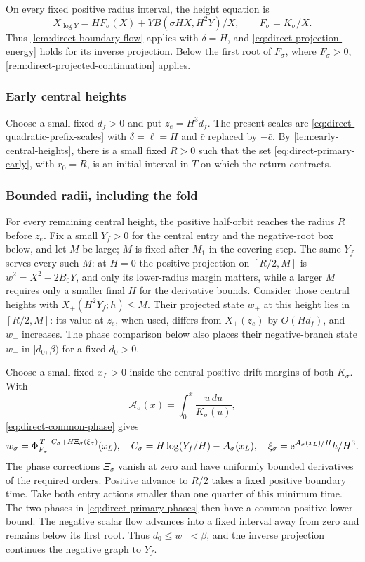 On every fixed positive radius interval, the height equation is
\[
 X_{\log Y}=HF_\sigma(X)+YB(\sigma HX,H^2Y)/X,\qquad
 F_\sigma=K_\sigma/X.
\]
Thus \cref{lem:direct-boundary-flow} applies with \(\delta=H\), and
\eqref{eq:direct-projection-energy} holds for its inverse projection.
Below the first root of \(F_\sigma\), where \(F_\sigma>0\),
\cref{rem:direct-projected-continuation} applies.

\subsubsection{Early central heights}

Choose a small fixed \(d_f>0\) and put \(z_e=H^3d_f\). The present
scales are \eqref{eq:direct-quadratic-prefix-scales} with
\(\delta=\ell=H\) and \(\bar c\) replaced by \(-\bar c\). By
\cref{lem:early-central-heights}, there is a small fixed \(R>0\) such
that the set \eqref{eq:direct-primary-early}, with \(r_0=R\), is an
initial interval in \(T\) on which the return contracts.

\subsubsection{Bounded radii, including the fold}

For every remaining central height, the positive half-orbit reaches
the radius \(R\) before \(z_e\). Fix a small \(Y_f>0\) for the central
entry and the negative-root box below, and let \(M\) be large; \(M\) is
fixed after \(M_1\) in the covering step. The same \(Y_f\) serves every
such \(M\): at \(H=0\) the positive projection on \([R/2,M]\) is
\(w^2=X^2-2B_0Y\), and only its lower-radius margin matters, while a
larger \(M\) requires only a smaller final \(H\) for the derivative
bounds.
Consider those central heights with \(X_+(H^2Y_f;h)\le M\).
Their projected state \(w_+\) at this height lies in \([R/2,M]\):
its value at \(z_e\), when used, differs from \(X_+(z_e)\)
by \(O(Hd_f)\), and \(w_+\) increases.
The phase comparison below also places their negative-branch state
\(w_-\) in \([d_0,\beta)\) for a fixed \(d_0>0\).

Choose a small fixed \(x_L>0\) inside the central positive-drift margins
of both \(K_\sigma\). With
\[
 \mathcal A_\sigma(x)=\int_0^x\frac{u\,du}{K_\sigma(u)},
\]
\eqref{eq:direct-common-phase} gives
\begin{equation}
\label{eq:direct-primary-phases}
 w_\sigma=\Phi_{F_\sigma}^{\,T+C_\sigma+
                              H\Xi_\sigma(\xi_\sigma)}(x_L),
 \quad
 C_\sigma=H\log(Y_f/H)-\mathcal A_\sigma(x_L),\quad
 \xi_\sigma=\mathrm e^{\mathcal A_\sigma(x_L)/H}h/H^3 .
\end{equation}
The phase corrections \(\Xi_\sigma\) vanish at zero and have
uniformly bounded derivatives of the required orders.
Positive advance to \(R/2\) takes a fixed positive boundary
time. Take both entry actions smaller than one quarter of
this minimum time. The two phases in
\eqref{eq:direct-primary-phases} then have a common positive
lower bound. The negative scalar flow advances into a fixed
interval away from zero and remains below its first root.
Thus \(d_0\le w_-<\beta\), and the inverse projection
continues the negative graph to \(Y_f\).

